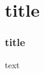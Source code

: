 \documentclass{beamer}
\begin{document}
\section{title}

\begin{frame}
    \frametitle{title}
    text
\end{frame}
\end{document}
